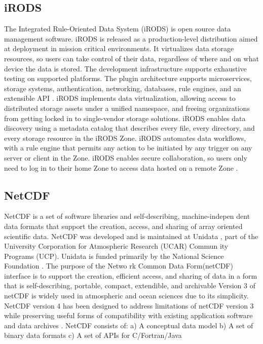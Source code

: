 {\subsection{iRODS}

     The Integrated Rule-Oriented Data System (iRODS) is open source
     data management software. iRODS is released as a production-level
     distribution aimed at deployment in mission critical
     environments. It virtualizes data storage resources, so users can
     take control of their data, regardless of where and on what
     device the data is stored. The development infrastructure
     supports exhaustive testing on supported platforms. The plugin
     architecture supports microservices, storage systems,
     authentication, networking, databases, rule engines, and an
     extensible API \cite{irods-www}.  iRODS implements data
     virtualization, allowing access to distributed storage assets
     under a unified namespace, and freeing organizations from getting
     locked in to single-vendor storage solutions. iRODS enables data
     discovery using a metadata catalog that describes every file,
     every directory, and every storage resource in the iRODS
     Zone. iRODS automates data workflows, with a rule engine that
     permits any action to be initiated by any trigger on any server
     or client in the Zone. iRODS enables secure collaboration, so
     users only need to log in to their home Zone to access data
     hosted on a remote Zone \cite{github-irods-www}.

     \pv


\subsection{NetCDF}

NetCDF is a set of software libraries and self-describing,
machine-indepen dent data formats that support the creation, access,
and sharing of array oriented scientific data. NetCDF was developed
and is maintained at Unidata , part of the University Corporation for
Atmospheric Research (UCAR) Commun ity Programs (UCP). Unidata is
funded primarily by the National Science Foundation
\cite{paper-netCDF} \cite{www-netcdf} . The purpose of the Netwo rk
Common Data Form(netCDF) interface is to support the creation,
efficient access, and sharing of data in a form that is
self-describing, portable, compact, extendible, and archivable Version
3 of netCDF is widely used in atmospheric and ocean sciences due to
its simplicity. NetCDF version 4 has been designed to address
limitations of netCDF version 3 while preserving useful forms of
compatibility with existing application software and data archives
\cite{paper-netCDF}.  NetCDF consists of: a) A conceptual data model
b) A set of binary data formats c) A set of APIs for C/Fortran/Java

}
